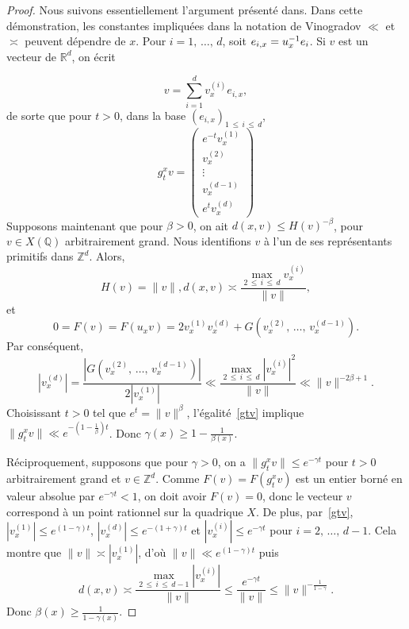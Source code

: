 \documentclass[AHL,Unicode,longabstracts,francais,published]{cedram}
\newcommand{\R}{\mathbb{R}}
\newcommand{\Z}{\mathbb{Z}}
\newcommand{\Q}{\mathbb{Q}}
\begin{document}
\begin{proof}
Nous suivons essentiellement l'argument présenté dans\linebreak\cite[Lemma~7.2]{fkms_quadric}. Dans cette démonstration, les constantes impliquées dans la notation de Vinogradov $\ll$ et $\asymp$ peuvent dépendre de $x$. Pour $i=1,\,\dots,\,d$, soit $e_{i,x}=\linebreak u_x^{-1}e_i$. Si $v$ est un vecteur de $\R^d$, on écrit

\[
v= \sum_{i=1}^d v_x^{(i)}e_{i,x},
\]
de sorte que pour $t>0$, dans la base $(e_{i,x})_{1\,\leq\,i\,\leq\,d}$,
\begin{equation}\label{gtv}
g_t^x v =
\begin{pmatrix}
e^{-t}v_x^{(1)} \\
v_x^{(2)}\\
\vdots\\
v_x^{(d-1)}\\
e^t v_x^{(d)}
\end{pmatrix}
\end{equation}
Supposons maintenant que pour $\beta>0$, on ait $d(x,v)\leq H(v)^{-\beta}$, pour $v\in X(\Q)$ arbitrairement grand. Nous identifions $v$ à l'un de ses représentants primitifs dans $\Z^d$. Alors, 
\[
H(v)=\|v\|, d(x,v)\asymp\frac{\max_{2\,\leq\,i\,\leq\,d}v_x^{(i)}}{\|v\|},
\]
et
\[
0 = F(v) = F(u_xv) = 2v_x^{(1)}v_x^{(d)} + G\left(v_x^{(2)},\,\dots,\,v_x^{(d-1)}\right).
\]
Par conséquent,
\[
\left|v_x^{(d)}\right|=\frac{\left|G\left(v_x^{(2)},\,\dots,\,v_x^{(d-1)}\right)\right|}{2\left|v_x^{(1)}\right|}
\ll \frac{\max\limits_{2\,\leq\,i\,\leq \,d} \left|v_x^{(i)}\right|^2}{\|v\|}
\ll \|v\|^{-2\beta+1}.
\]
Choisissant $t>0$ tel que $e^{t}=\|v\|^{\beta}$, l'égalité~\eqref{gtv} implique $\|g_t^xv\|\ll e^{-(1-\frac{1}{\beta})t}$. Donc $\gamma(x)\geq 1-\frac{1}{\beta(x)}$.

Réciproquement, supposons que pour $\gamma>0$, on a $\|g_t^xv\|\leq e^{-\gamma t}$ pour $t>0$ arbitrairement grand et $v\in\Z^d$. Comme $F(v)=F(g_t^xv)$ est un entier borné en valeur absolue par $e^{-\gamma t}<1$, on doit avoir $F(v)=0$, donc le vecteur $v$ correspond à un point rationnel sur la quadrique $X$. De plus, par~\eqref{gtv}, $|v_x^{(1)}|\leq e^{(1-\gamma)t}$, $|v_x^{(d)}|\leq e^{-(1+\gamma)t}$ et $|v_x^{(i)}|\leq e^{-\gamma t}$ pour $i=2,\,\dots,\,d-1$. Cela montre que $\|v\|\asymp |v_x^{(1)}|$, d'où $\|v\|\ll e^{(1-\gamma)t}$ puis
\[
d(x,v) \asymp \frac{\max\limits_{2\,\leq\,i\,\leq\,d-1}\left|v_x^{(i)}\right|}{\|v\|} \leq \frac{e^{-\gamma t}}{\|v\|} \leq \|v\|^{-\frac{1}{1-\gamma}}.
\]
Donc $\beta(x)\geq\frac{1}{1-\gamma(x)}$.
\end{proof}
\end{document}
